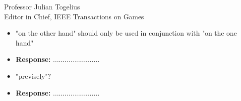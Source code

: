 \documentclass[10pt]{letter} %
\begin{document}
\begin{letter}{Professor Julian Togelius \\ Editor in Chief, IEEE Transactions on Games}
\begin{enumerate}
\begin{itemize}
\begin{itemize}
				\item 	"on the other hand" should only be used in conjunction with "on the one hand"\\
				\item {\bf Response:} ........................
				\item 	"previsely"?\\
				\item {\bf Response:} ........................
			
			\end{itemize}
	
\end{itemize}
\end{enumerate}
 






\end{letter}
 
\end{document}
